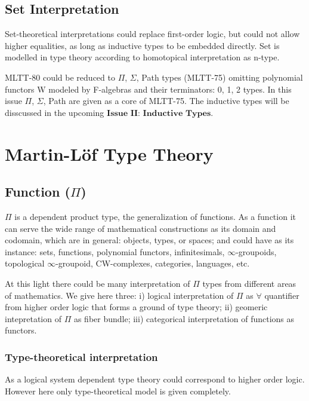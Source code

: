 \documentclass{article}
\theoremstyle{definition}
\begin{document}
\subsection{Set Interpretation}

Set-theoretical interpretations could replace first-order logic, but could not allow
higher equalities, as long as inductive types to be embedded directly. Set is modelled
in type theory according to homotopical interpretation as n-type.

MLTT-80 could be reduced to $\Pi$, $\Sigma$, Path types (MLTT-75) omitting polynomial
functors W modeled by F-algebras and their terminators: 0, 1, 2 types.
In this issue $\Pi$, $\Sigma$, Path are given as a core of MLTT-75. The inductive types
will be disscussed in the upcoming $\textbf{Issue II: Inductive Types}$.

\section{Martin-Löf Type Theory}

\subsection{Function ($\Pi$)}

$\Pi$ is a dependent product type, the generalization of functions.
As a function it can serve the wide range of mathematical constructions as its domain and codomain,
which are in general: objects, types, or spaces; and could have as its
instance: sets, functions, polynomial functors, infinitesimals, $\infty$-groupoids,
topological $\infty$-groupoid, CW-complexes,
categories, languages, etc.

At this light there could be many interpretation of $\Pi$ types from different
areas of mathematics. We give here three: i) logical interpretation of $\Pi$ as
$\forall$ quantifier from higher order logic
that forms a ground of type theory; ii) geomeric intepretation of $\Pi$ as fiber bundle;
iii) categorical interpretation of functions as functors.

\subsubsection*{Type-theoretical interpretation}

As a logical system dependent type theory could correspond to higher order logic.
However here only type-theoretical model is given completely.
\end{document}
